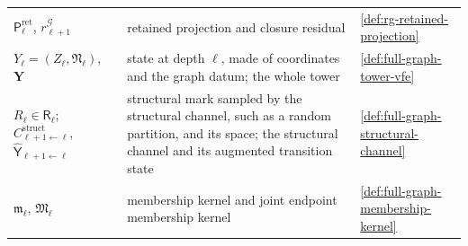 {\begin{longtable}{@{}>{\raggedright\arraybackslash}p{}
>{\raggedright\arraybackslash}p{}
>{\raggedright\arraybackslash}p{}@{}}
$\mathsf P^{\mathrm{ret}}_\ell$, $r^{\mathcal G}_{\ell+1}$ & retained projection and closure residual & \cref{def:rg-retained-projection} \\
$Y_\ell=(Z_\ell,\mathfrak N_\ell)$, $\mathbf Y$ & state at depth $\ell$, made of coordinates and the graph datum; the whole tower & \cref{def:full-graph-tower-vfe} \\
$R_\ell\in\mathsf R_\ell$; $C^{\mathrm{struct}}_{\ell+1\leftarrow\ell}$, $\widehat{\mathsf Y}_{\ell+1\leftarrow\ell}$ & structural mark sampled by the structural channel, such as a random partition, and its space; the structural channel and its augmented transition state & \cref{def:full-graph-structural-channel} \\
$\mathfrak m_\ell$, $\mathfrak M_\ell$ & membership kernel and joint endpoint membership kernel & \cref{def:full-graph-membership-kernel} \\
\end{longtable}
}

